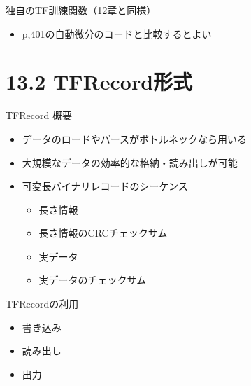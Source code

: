 \documentclass[aspectratio=169, dvipdfmx, 14pt, xcolor={svgnames,dvipsnames}, t]{beamer}
\begin{document}

\begin{frame}{独自のTF訓練関数（12章と同様）}

  \begin{itemize}
    \tightlist
    \item
          p,401の自動微分のコードと比較するとよい
  \end{itemize}

\end{frame}


\hypertarget{tfrecordux5f62ux5f0f}{%
  \section{13.2 TFRecord形式}\label{tfrecordux5f62ux5f0f}}


\begin{frame}{TFRecord 概要}

  \begin{itemize}
    \tightlist
    \item
          データのロードやパースがボトルネックなら用いる
    \item
          大規模なデータの効率的な格納・読み出しが可能
    \item
          可変長バイナリレコードのシーケンス

          \begin{itemize}
            \tightlist
            \item
                  長さ情報
            \item
                  長さ情報のCRCチェックサム
            \item
                  実データ
            \item
                  実データのチェックサム
          \end{itemize}
  \end{itemize}

\end{frame}


\begin{frame}{TFRecordの利用}

  \begin{itemize}
    \tightlist
    \item
          書き込み
    \item
          読み出し
    \item
          出力
  \end{itemize}

\end{frame}
\end{document}
